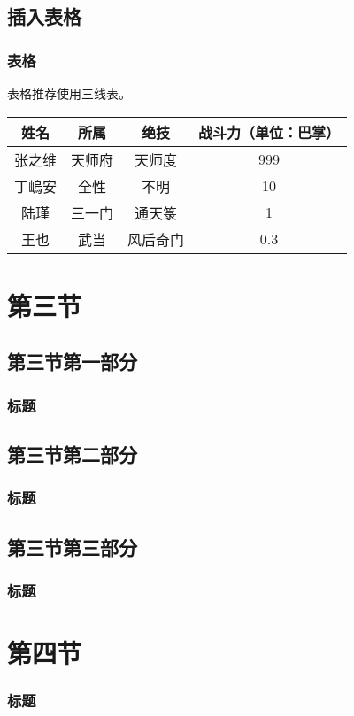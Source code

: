 \documentclass[10pt]{beamer}	%
\begin{document}
\subsection{插入表格}

\begin{frame}
\frametitle{表格}
表格推荐使用三线表。
\begin{table}[htb]
\centering\scriptsize
 \label{tab:TSVSOther}
 \begin{tabular}{cccc}
\toprule
姓名 & 所属 & 绝技 & 战斗力（单位：巴掌）\\
\midrule
张之维 & 天师府  & 天师度 & 999\\
丁嵨安 & 全性 & 不明 & 10\\
陆瑾 & 三一门 & 通天箓 & 1\\
王也 & 武当 & 风后奇门 & 0.3\\
\bottomrule
\end{tabular}
\end{table}
\end{frame}

\section{第三节}

\subsection{第三节第一部分}

\begin{frame}
	\frametitle{标题}
\end{frame}

\subsection{第三节第二部分}

\begin{frame}
	\frametitle{标题}
\end{frame}

\subsection{第三节第三部分}

\begin{frame}
	\frametitle{标题}
\end{frame}

\section{第四节}
\begin{frame}
	\frametitle{标题}
\end{frame}
\end{document}
